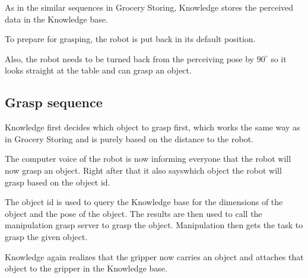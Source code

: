 \documentclass[main.tex]{subfiles}
\begin{document}
	\begin{knowledge}
	As in the similar sequences in Grocery Storing, Knowledge stores the perceived data in the Knowledge base.
	\end{knowledge}
	
	\begin{manipulation}
	To prepare for grasping, the robot is put back in its default position.
	\end{manipulation}
	
	
	
	\begin{navigation}
	Also, the robot needs to be turned back from the perceiving pose by $90^\circ$ so it looks straight at the table and can grasp an object.
	\end{navigation}
	
	\subsection{Grasp sequence}\label{clean_up_grasp_seq}
	
	\begin{knowledge}
	Knowledge first decides which object to grasp first, which works the same way as in Grocery Storing and is purely based on the distance to the robot.
	\end{knowledge}
	
	\begin{nlp}
	The computer voice of the robot is now informing everyone that the robot will now grasp an object. Right after that it also sayswhich object the robot will grasp based on the object id.
	\end{nlp}
	
	\begin{manipulation}
	The object id is used to query the Knowledge base for the dimensions of the object and the pose of the object. The results are then used to call the manipulation grasp server to grasp the object. Manipulation then gets the task to grasp the given object.
	\end{manipulation}
	 \begin{knowledge}
	 Knowledge again realizes that the gripper now carries an object and attaches that object to the gripper in the Knowledge base.
	 \end{knowledge}
	 
\end{document}
